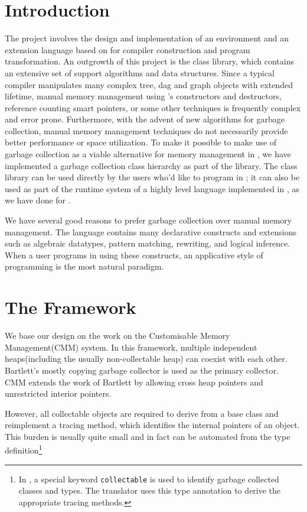 \section{Introduction}
   The \Prop{} project involves the design and implementation of 
an environment and an extension language based on \CPP{} 
for compiler construction and program transformation.  
An outgrowth of this project is the \ADLib{} 
\CPP{} class library, which contains an extensive set of support algorithms 
and data structures.  Since a typical compiler manipulates many complex tree,
dag and graph objects with extended lifetime, manual memory management using
\CPP's constructors and destructors, reference counting smart pointers, or
some other techniques is frequently complex and error prone.  
Furthermore, with the advent of new algorithms for garbage collection,
manual memory management techniques do not necessarily provide better 
performance or space utilization.  To make it possible to make use of garbage 
collection as a viable alternative for memory management in
\CPP\cite{Safe-C++-GC}, we have implemented a garbage collection class 
hierarchy as part of the \ADLib{} library.  The class library can be used
directly by the users who'd like to program in \CPP; it can also be
used as part of the runtime system of a highly level language implemented
in \CPP, as we have done for \Prop.

   We have several good reasons to prefer garbage collection over manual 
memory management.  The \Prop{} language contains many declarative constructs 
and extensions such as algebraic datatypes, pattern matching, rewriting, and
logical inference.  When a user programs in \Prop{} using these constructs, 
an applicative style of programming is the most natural paradigm.  

\section{The Framework}

   We base our design on the work on the Customisable Memory Management(CMM)
system\cite{CMM}.  In this framework, multiple independent heaps(including
the usually non-collectable heap) can coexist with each other.
Bartlett's mostly copying garbage collector is used as the primary collector.
CMM extends the work of Bartlett\cite{Mostly-copying} 
by allowing cross heap pointers and unrestricted interior pointers.

  However, all collectable objects are required to derive from a base class 
and reimplement a tracing method, which identifies the internal pointers of 
an object.  This burden is usually quite small and in fact can be
automated from the type definition\footnote{In \Prop, a special keyword
\verb|collectable| is used to identify garbage collected classes and types.
The \Prop{} translator uses this type annotation to derive the appropriate  
tracing methods.}

